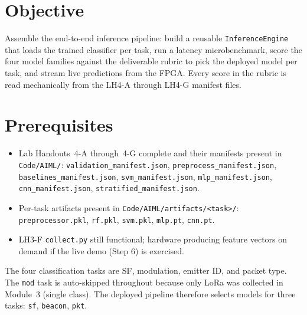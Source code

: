 \documentclass[11pt,letterpaper]{article}
\begin{document}

\section{Objective}
Assemble the end-to-end inference pipeline: build a reusable \texttt{InferenceEngine} that loads the trained classifier per task, run a latency microbenchmark, score the four model families against the deliverable rubric to pick the deployed model per task, and stream live predictions from the \mbox{FPGA}. Every score in the rubric is read mechanically from the LH4-A through LH4-G manifest files.

\section{Prerequisites}
\begin{itemize}[leftmargin=2em]
	\item Lab Handouts~4-A through~4-G complete and their manifests present in \texttt{Code/AIML/}: \texttt{validation\_manifest.json}, \texttt{preprocess\_manifest.json}, \texttt{baselines\_manifest.json}, \texttt{svm\_manifest.json}, \texttt{mlp\_manifest.json}, \texttt{cnn\_manifest.json}, \texttt{stratified\_manifest.json}.
	\item Per-task artifacts present in \texttt{Code/AIML/artifacts/<task>/}: \texttt{preprocessor.pkl}, \texttt{rf.pkl}, \texttt{svm.pkl}, \texttt{mlp.pt}, \texttt{cnn.pt}.
	\item LH3-F \texttt{collect.py} still functional; hardware producing feature vectors on demand if the live demo (Step 6) is exercised.
\end{itemize}

\begin{tcolorbox}[infobox={Tasks scoped in this handout}]
The four classification tasks are SF, modulation, emitter \mbox{ID}, and packet type. The \texttt{mod} task is auto-skipped throughout because only \mbox{LoRa} was collected in Module~3 (single class). The deployed pipeline therefore selects models for three tasks: \texttt{sf}, \texttt{beacon}, \texttt{pkt}.
\end{tcolorbox}

\newpage
\end{document}
